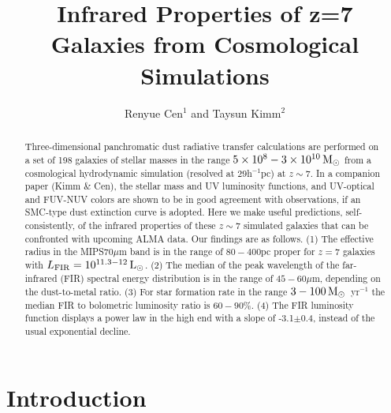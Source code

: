 



\def\picturesize{7.05}
\def\pictureskip{-1.9}
\def\picturecapskip{-1.0}





\title{Infrared Properties of z=7 Galaxies from Cosmological Simulations}
 
\author{
Renyue Cen$^{1}$ and  
Taysun Kimm$^{2}$ 
} 





\begin{abstract} 

Three-dimensional panchromatic dust radiative transfer calculations are performed 
on a set of 198 galaxies of stellar masses in the range $5\times 10^8-3\times10^{10}{\rm\,M_\odot}$ 
from a cosmological hydrodynamic simulation (resolved at $29$h$^{-1}$pc) at $z\sim 7$.
In a companion paper (Kimm \& Cen), the stellar mass and UV luminosity functions, and UV-optical and FUV-NUV colors
are shown to be in good agreement with observations, if an SMC-type dust extinction curve is adopted. 
Here we make useful predictions, self-consistently, of the infrared properties of these $z\sim 7$ simulated galaxies that 
can be confronted with upcoming ALMA data.
Our findings are as follows.
(1) The effective radius in the MIPS$70\mu$m band is in the range of $80-400$pc proper for $z=7$ galaxies with $L_{\rm FIR}=10^{11.3-12}{\rm\,L_\odot}$.
(2) The median of the peak wavelength of the far-infrared (FIR) spectral energy distribution is in the range of $45-60\mu$m, depending on the dust-to-metal ratio.
(3) For star formation rate in the range $3-100{\rm\,M_\odot}$~yr$^{-1}$ the median FIR to bolometric luminosity ratio is $60-90\%$.
(4) The FIR luminosity function displays a power law in the high end with a slope of -3.1$\pm$0.4, instead of the usual exponential decline.



\end{abstract}
 
 


\section{Introduction}

